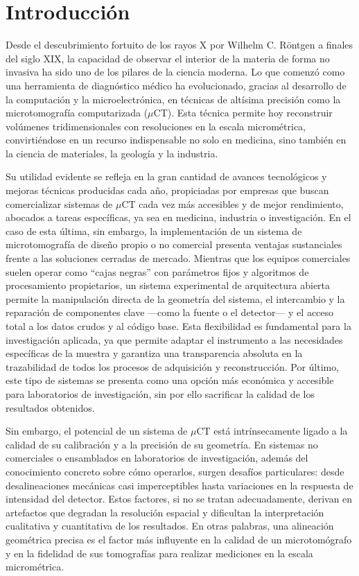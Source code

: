 \chapter{Introducción}
\label{introduccion}

Desde el descubrimiento fortuito de los rayos X por Wilhelm C. Röntgen a finales del siglo
XIX, la capacidad de observar el interior de la materia de forma no invasiva ha sido uno
de los pilares de la ciencia moderna. Lo que comenzó como una herramienta de diagnóstico
médico ha evolucionado, gracias al desarrollo de la computación y la microelectrónica,
en técnicas de altísima precisión como la microtomografía computarizada ($\mu$CT).
Esta técnica permite hoy reconstruir volúmenes tridimensionales con resoluciones en la
escala micrométrica, convirtiéndose en un recurso indispensable no solo en medicina,
sino también en la ciencia de materiales, la geología y la industria. \cite{Stock2019}

Su utilidad evidente se refleja en la gran cantidad de avances tecnológicos y mejoras
técnicas producidas cada año, propiciadas por empresas que buscan comercializar sistemas de
$\mu$CT cada vez más accesibles y de mejor rendimiento, abocados a tareas específicas,
ya sea en medicina, industria o investigación. En el caso de esta última, sin embargo,
la implementación de un sistema de microtomografía de diseño propio o no comercial presenta
ventajas sustanciales frente a las soluciones cerradas de mercado. Mientras que los
equipos comerciales suelen operar como ``cajas negras'' con parámetros fijos y algoritmos
de procesamiento propietarios, un sistema experimental de arquitectura abierta permite la manipulación directa
de la geometría del sistema, el intercambio y la reparación de componentes clave —como la fuente 
o el detector— y el acceso total a los datos crudos y al código base. Esta flexibilidad es 
fundamental para la investigación aplicada, ya que permite adaptar el instrumento a las 
necesidades específicas de la muestra y garantiza una transparencia absoluta en la 
trazabilidad de todos los procesos de adquisición y reconstrucción. Por último, este tipo
de sistemas se presenta como una opción más económica y accesible para laboratorios de
investigación, sin por ello sacrificar la calidad de los resultados obtenidos.

Sin embargo, el potencial de un sistema de $\mu$CT está intrínsecamente ligado a la calidad
de su calibración y a la precisión de su geometría. En sistemas no comerciales o ensamblados
en laboratorios de investigación, además del conocimiento concreto sobre cómo operarlos,
surgen desafíos particulares: desde desalineaciones 
mecánicas casi imperceptibles hasta variaciones en la respuesta de intensidad del detector.
Estos factores, si no se tratan adecuadamente, derivan en artefactos que degradan la
resolución espacial y dificultan la interpretación cualitativa y cuantitativa de los resultados.
En otras palabras, una alineación geométrica precisa es el factor más influyente en la
calidad de un microtomógrafo y en la fidelidad de sus tomografías para realizar mediciones
en la escala micrométrica.

